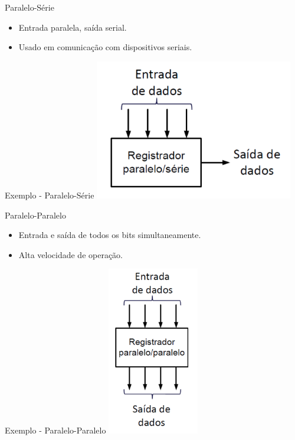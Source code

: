 \documentclass{beamer}
\begin{document}
\begin{frame}{Paralelo-Série}
\begin{itemize}
    \item Entrada paralela, saída serial.
    \item Usado em comunicação com dispositivos seriais.
\end{itemize}
\end{frame}

\begin{frame}{Exemplo - Paralelo-Série}
\centering
\includegraphics[width=0.65\textwidth]{figures/paralelo_serie.png}
\end{frame}

\begin{frame}{Paralelo-Paralelo}
\begin{itemize}
    \item Entrada e saída de todos os bits simultaneamente.
    \item Alta velocidade de operação.
\end{itemize}
\end{frame}

\begin{frame}{Exemplo - Paralelo-Paralelo}
\centering
\includegraphics[width=0.3\textwidth]{figures/paralelo_paralelo.png}
\end{frame}
\end{document}
